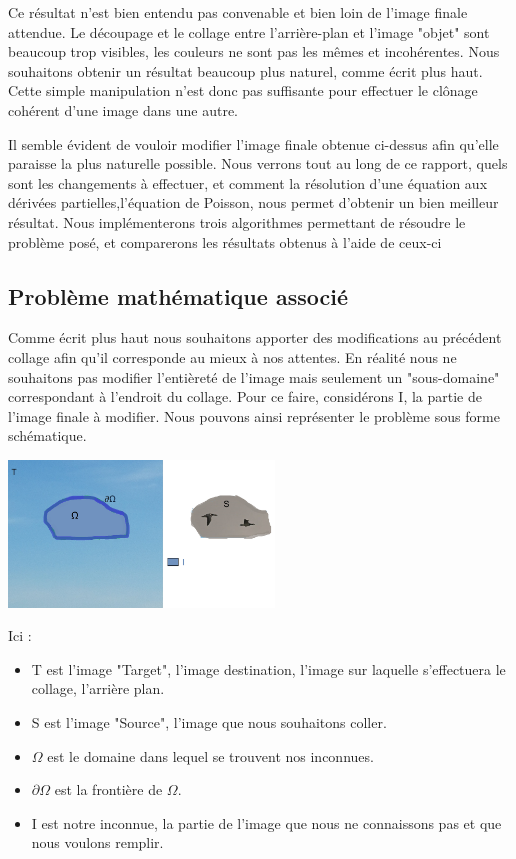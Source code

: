 Ce résultat n'est bien entendu pas convenable et bien loin de l'image finale attendue. Le découpage et le collage entre l'arrière-plan et l'image "objet" sont beaucoup trop visibles, les couleurs ne sont pas les mêmes et incohérentes. Nous souhaitons obtenir un résultat beaucoup plus naturel, comme écrit plus haut. Cette simple manipulation n'est donc pas suffisante pour effectuer le clônage cohérent  d'une image dans une autre. \newline

Il semble évident de vouloir modifier l'image finale obtenue ci-dessus afin qu'elle paraisse la plus naturelle possible.
Nous verrons tout au long de ce rapport, quels sont les changements à effectuer, et comment la résolution d'une équation aux dérivées partielles,l'équation de Poisson, nous permet d'obtenir un bien meilleur résultat. Nous implémenterons trois algorithmes permettant de résoudre le problème posé, et comparerons les résultats obtenus à l'aide de ceux-ci

\subsection{Problème mathématique associé}

Comme écrit plus haut nous souhaitons apporter des modifications au précédent collage afin qu'il corresponde au mieux à nos attentes. En réalité nous ne souhaitons pas modifier l'entièreté de l'image mais seulement un "sous-domaine" correspondant à l'endroit du collage. Pour ce faire, considérons I, la partie de l'image finale à modifier. Nous pouvons ainsi représenter le problème sous forme schématique. 
\begin{center}
    \includegraphics[width = 200pt]{Images/Schee.jpg}
\end{center}

Ici : 
\begin{itemize}
    \item T est l'image "Target", l'image destination, l'image sur laquelle s'effectuera le collage, l'arrière plan. 
    \item S est l'image "Source", l'image que nous souhaitons coller.
    \item $\Omega$ est le domaine dans lequel se trouvent nos inconnues.
    \item $\partial \Omega$ est la frontière de $\Omega$.
    \item I est notre inconnue, la partie de l'image que nous ne connaissons pas et que nous voulons remplir.
\end{itemize}

